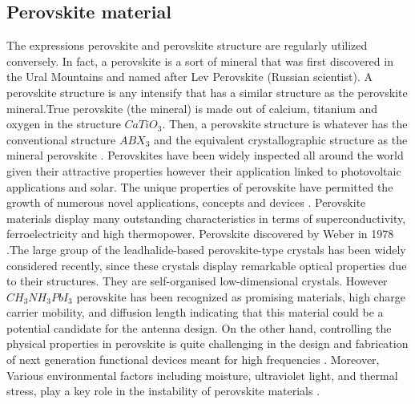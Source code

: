 \documentclass[12pt]{suhbook}
\begin{document}
\subsection{Perovskite material}
% 
The expressions perovskite and perovskite structure are regularly utilized conversely. In fact, a perovskite is a sort of mineral that was first discovered in the Ural Mountains and named after Lev Perovskite (Russian scientist)\cite{park2016organic}. A perovskite structure is any intensify that has a similar structure as the perovskite mineral.True perovskite (the mineral) is made out of calcium, titanium and oxygen in the structure $CaTiO_3$. Then, a perovskite structure is whatever has the conventional structure $ABX_3$ and the equivalent crystallographic structure as the mineral perovskite \cite{chanana2017colour}. Perovskites have been widely inspected all around the world given their attractive properties however their application linked to photovoltaic applications and solar\cite{song2015perovskite}. The unique properties of perovskite have permitted the growth of numerous novel applications, concepts and devices \cite{song2015perovskite}. Perovskite materials display many outstanding characteristics in terms of superconductivity, ferroelectricity and high thermopower\cite{kulkarni2012mixed}. Perovskite discovered by Weber in 1978 \cite{noel2014enhanced}.The large group of the leadhalide-based perovskite-type crystals has been widely considered  recently, since these crystals display remarkable optical properties due to their structures. They are self-organised low-dimensional crystals. However $CH_3NH_3PbI_3$ perovskite has been recognized as promising materials, high charge carrier mobility, and diffusion length indicating that this material could be a potential candidate for the antenna design. On the other hand, controlling the physical properties in perovskite is quite challenging in the design and fabrication of next generation functional devices meant for high frequencies \cite{ahmad2017instability}. Moreover, Various environmental factors including moisture, ultraviolet light, and thermal stress, play a key role in the instability of perovskite materials \cite{green2014emergence}.
% 
\end{document}
